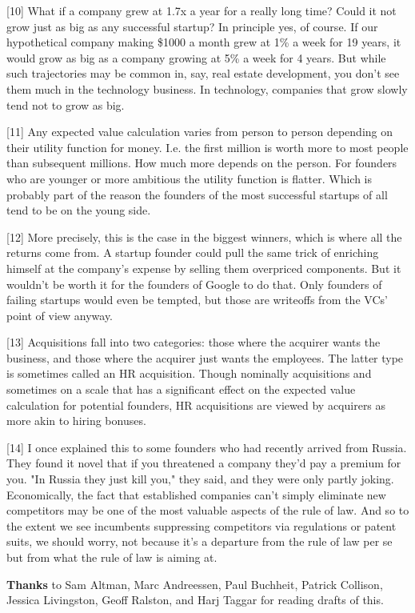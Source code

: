[10]
What if a company grew at 1.7x a year for a really long time?
Could it not grow just as big as any successful startup?  In principle
yes, of course. If our hypothetical company making \$1000 a month
grew at 1\% a week for 19 years, it would grow as big as a company
growing at 5\% a week for 4 years.  But while such trajectories may
be common in, say, real estate development, you don't see them much
in the technology business.  In technology, companies that grow
slowly tend not to grow as big.

[11]
Any expected value calculation varies from person to person
depending on their utility function for money.  I.e. the first
million is worth more to most people than subsequent millions.  How
much more depends on the person.  For founders who are younger or
more ambitious the utility function is flatter.  Which is probably
part of the reason the founders of the most successful startups of
all tend to be on the young side.

[12]
More precisely, this is the case in the biggest winners, which
is where all the returns come from.  A startup founder could pull
the same trick of enriching himself at the company's expense by
selling them overpriced components.  But it wouldn't be worth it
for the founders of Google to do that.  Only founders of failing
startups would even be tempted, but those are writeoffs from the
VCs' point of view anyway.

[13]
Acquisitions fall into two categories: those where the acquirer
wants the business, and those where the acquirer just wants the
employees.  The latter type is sometimes called an HR acquisition.
Though nominally acquisitions and sometimes on a scale that has a
significant effect on the expected value calculation for potential
founders, HR acquisitions are viewed by acquirers as more akin to
hiring bonuses.

[14]
I once explained this to some founders who had recently arrived
from Russia.  They found it novel that if you threatened a company
they'd pay a premium for you.  "In Russia they just kill you," they
said, and they were only partly joking.  Economically, the fact
that established companies can't simply eliminate new competitors
may be one of the most valuable aspects of the rule of law.  And
so to the extent we see incumbents suppressing competitors via
regulations or patent suits, we should worry, not because it's a
departure from the rule of law per se but from what the rule of law
is aiming at.


\textbf{Thanks} to Sam Altman, Marc Andreessen, Paul Buchheit, Patrick
Collison, Jessica Livingston, Geoff Ralston, and Harj Taggar for
reading drafts of this.



